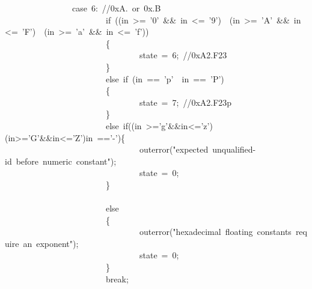 \documentclass{article}
\begin{document}
\begin{mdpre}
~~~~~~~~~~~~~~~~{case}~{6}:~{//0xA.~or~0x.B}\\
~~~~~~~~~~~~~~~~~~~~~~~~{if}~((in~\textgreater{}=~{'0'}~\&\&~in~\textless{}=~{'9'})~\textbar{}\textbar{}~(in~\textgreater{}=~{'A'}~\&\&~in~\textless{}=~{'F'})~\textbar{}\textbar{}~(in~\textgreater{}=~{'a'}~\&\&~in~\textless{}=~{'f'}))\\
~~~~~~~~~~~~~~~~~~~~~~~~\{\\
~~~~~~~~~~~~~~~~~~~~~~~~~~~~~~~~state~=~{6};~{//0xA2.F23}\\
~~~~~~~~~~~~~~~~~~~~~~~~\}\\
~~~~~~~~~~~~~~~~~~~~~~~~{else}~{if}~(in~==~{'p'}~\textbar{}\textbar{}~in~==~{'P'})\\
~~~~~~~~~~~~~~~~~~~~~~~~\{\\
~~~~~~~~~~~~~~~~~~~~~~~~~~~~~~~~state~=~{7};~{//0xA2.F23p}\\
~~~~~~~~~~~~~~~~~~~~~~~~\}\\
~~~~~~~~~~~~~~~~~~~~~~~~{else}~{if}((in~\textgreater{}={'g'}\&\&in\textless{}={'z'})\textbar{}\textbar{}(in\textgreater{}={'G'}\&\&in\textless{}={'Z'})\textbar{}\textbar{}in~=={'-'})\{\\
~~~~~~~~~~~~~~~~~~~~~~~~~~~~~~~~outerror({"}{expected~unqualified-id~before~numeric~constant}{"});\\
~~~~~~~~~~~~~~~~~~~~~~~~~~~~~~~~state~=~{0};\\
~~~~~~~~~~~~~~~~~~~~~~~~\}\\
~~~~~~~~~~~~~~~~~~~~~~~~\\
~~~~~~~~~~~~~~~~~~~~~~~~{else}\\
~~~~~~~~~~~~~~~~~~~~~~~~\{\\
~~~~~~~~~~~~~~~~~~~~~~~~~~~~~~~~outerror({"}{hexadecimal~floating~constants~require~an~exponent}{"});\\
~~~~~~~~~~~~~~~~~~~~~~~~~~~~~~~~state~=~{0};\\
~~~~~~~~~~~~~~~~~~~~~~~~\}\\
~~~~~~~~~~~~~~~~~~~~~~~~{break};\\

\end{mdpre}
\end{document}
